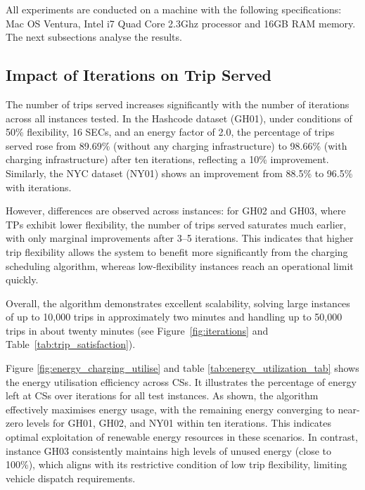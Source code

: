 
All experiments are conducted on a machine with the following specifications: Mac OS Ventura, Intel i7 Quad Core 2.3Ghz processor and 16GB RAM memory. %
The next subsections analyse the results. 

\subsection{Impact of Iterations on Trip Served}

The number of trips served increases significantly with the number of iterations across all instances tested. In the Hashcode dataset (GH01), under conditions of 50\% flexibility, 16 SECs, and an energy factor of 2.0, the percentage of trips served rose from 89.69\% (without any charging infrastructure) to 98.66\% (with charging infrastructure) after ten iterations, reflecting a 10\% improvement. Similarly, the NYC dataset (NY01) shows an improvement from 88.5\% to 96.5\% with iterations. 

However, differences are observed across instances: for GH02 and GH03, where TPs exhibit lower flexibility, the number of trips served saturates much earlier, with only marginal improvements after 3--5 iterations. This indicates that higher trip flexibility allows the system to benefit more significantly from the charging scheduling algorithm, whereas low-flexibility instances reach an operational limit quickly. 

Overall, the algorithm demonstrates excellent scalability, solving large instances of up to 10,000 trips in approximately two minutes and handling up to 50,000 trips in about twenty minutes (see Figure~\ref{fig:iterations} and Table~\ref{tab:trip_satisfaction}). 

Figure \ref{fig:energy_charging_utilise}  and table \ref{tab:energy_utilization_tab} shows the energy utilisation efficiency across CSs. It illustrates the percentage of energy left at CSs over iterations for all test instances. As shown, the algorithm effectively maximises energy usage, with the remaining energy converging to near-zero levels for GH01, GH02, and NY01 within ten iterations. This indicates optimal exploitation of renewable energy resources in these scenarios. In contrast, instance GH03 consistently maintains high levels of unused energy (close to 100\%), which aligns with its restrictive condition of low trip flexibility, limiting vehicle dispatch requirements.

